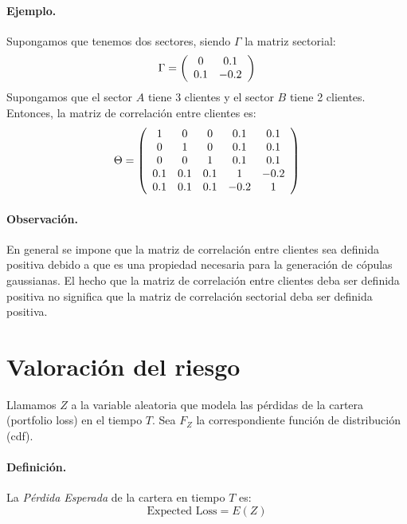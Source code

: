 \paragraph{Ejemplo.}Supongamos que tenemos dos sectores, siendo $\Gamma$ la
matriz sectorial:
\begin{displaymath}
\Gamma=\left(
\begin{array}{cc}
 0  &  0.1 \cr
0.1 & -0.2
\end{array}
\right)
\end{displaymath}
Supongamos que el sector $A$ tiene 3 clientes y el sector $B$ tiene 2 clientes.
Entonces, la matriz de correlaci\'on entre clientes es:
\begin{displaymath}
\Theta = \left(
\begin{array}{ccccc}
  1  &  0  &  0    &  0.1 &  0.1 \cr
  0  &  1  &  0    &  0.1 &  0.1 \cr
  0  &  0  &  1    &  0.1 &  0.1 \cr
 0.1 & 0.1 &  0.1  &  1   & -0.2 \cr
 0.1 & 0.1 &  0.1  & -0.2 &  1
\end{array}
\right)
\end{displaymath}


\paragraph{Observaci\'on.}  En general se impone
que la matriz de correlaci\'on entre clientes sea definida positiva
debido a que es una propiedad necesaria para la generaci\'on de c\'opulas
gaussianas. El hecho que la matriz de correlaci\'on entre clientes deba ser
definida positiva no significa que la matriz de correlaci\'on sectorial
deba ser definida positiva.


\section{Valoraci\'on del riesgo}

Llamamos $Z$ a la variable aleatoria que modela las p\'erdidas de la cartera
(portfolio loss) en el tiempo $T$. Sea $F_Z$ la correspondiente funci\'on de
distribuci\'on (cdf).

\paragraph{Definici\'on.} La \emph{P\'erdida Esperada}
de la cartera en tiempo $T$ es:
\begin{equation}
\textrm{Expected Loss} = E(Z)
\end{equation}

